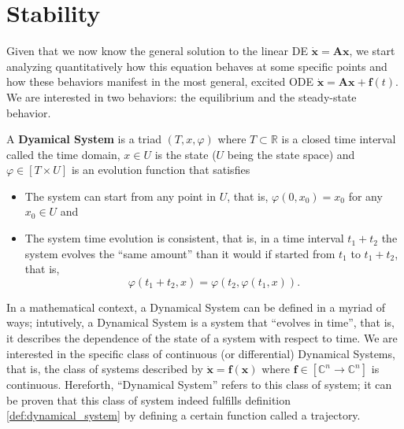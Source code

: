 \section{Stability} %

	Given that we now know the general solution to the linear DE $\dot{\mathbf{x}} = \mathbf{Ax}$, we start analyzing quantitatively how this equation behaves at some specific points and how these behaviors manifest in the most general, excited ODE $\dot{\mathbf{x}} = \mathbf{Ax + f}(t)$. We are interested in two behaviors: the equilibrium and the steady-state behavior. 

\begin{definition}\label{def:dynamical_system} A \textbf{Dyamical System} is a triad $\left(T,x,\varphi\right)$ where $T\subset\mathbb{R}$ is a closed time interval called the time domain, $x\in U$ is the state ($U$ being the state space) and $\varphi\in\left[T\times U\right]$ is an evolution function that satisfies

\begin{itemize}
	\item The system can start from any point in $U$, that is, $\varphi\left(0,x_0\right) = x_0$ for any $x_0\in U$ and
	\item The system time evolution is consistent, that is, in a time interval $t_1 + t_2$ the system evolves the ``same amount'' than it would if started from $t_1$ to $t_1 + t_2$, that is,
	\begin{equation} \varphi\left(t_1 + t_2,x\right) = \varphi\left(t_2,\varphi\left(t_1,x\right)\right).\end{equation}
\end{itemize}
\end{definition}

	In a mathematical context, a Dynamical System can be defined in a myriad of ways; intutively, a Dynamical System is a system that ``evolves in time'', that is, it describes the dependence of the state of a system with respect to time. We are interested in the specific class of continuous (or differential) Dynamical Systems, that is, the class of systems described by $\dot{\mathbf{x}} = \mathbf{f(x)}$ where $\mathbf{f}\in\left[\mathbb{C}^n\to\mathbb{C}^n\right]$ is continuous. Hereforth, ``Dynamical System'' refers to this class of system; it can be proven that this class of system indeed fulfills definition \ref{def:dynamical_system} by defining a certain function called a trajectory.


